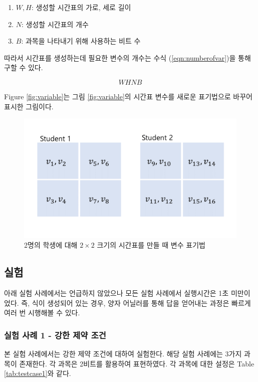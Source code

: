 \documentclass{article}
\begin{document}
    \begin{enumerate}
        \item [] $W,H$: 생성할 시간표의 가로, 세로 길이
        \item [] $N$: 생성할 시간표의 개수
        \item [] $B$: 과목을 나타내기 위해 사용하는 비트 수
    \end{enumerate}

따라서 시간표를 생성하는데 필요한 변수의 개수는 수식 (\ref{eqn:numberofvar})을 통해 구할 수 있다.

    \begin{equation}\label{eqn:numberofvar}
        WHNB
    \end{equation}

Figure \ref{fig:variable}는 그림 \ref{fig:variable}의 시간표 변수를 새로운 표기법으로 바꾸어 표시한 그림이다.

    \begin{figure}[htb!]
        \centering
        \includegraphics[width=0.8\columnwidth]{images/var2.png}
        \caption{2명의 학생에 대해 $2 \times 2$ 크기의 시간표를 만들 때 변수 표기법}
        \label{fig:newvar}
    \end{figure}

    \subsection{실험}

아래 실험 사례에서는 언급하지 않았으나 모든 실험 사례에서 실행시간은 1초 미만이었다. 즉, 식이 생성되어 있는 경우, 양자 어닐러를 통해 답을 얻어내는 과정은 빠르게 여러 번 시행해볼 수 있다.

    \subsubsection{실험 사례 1 - 강한 제약 조건}

본 실험 사례에서는 강한 제약 조건에 대하여 실험한다. 해당 실험 사례에는 3가지 과목이 존재한다. 각 과목은 2비트를 활용하여 표현하였다. 각 과목에 대한 설정은 Table \ref{tab:testcase1}와 같다.
\end{document}
